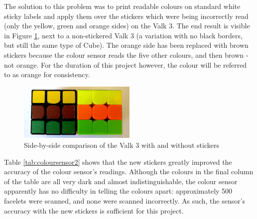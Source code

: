 \documentclass{report}
\begin{document}
	The solution to this problem was to print readable colours on standard white sticky labels and apply them over the stickers which were being incorrectly read (only the yellow, green and orange sides) on the Valk 3. The end result is visible in Figure \ref{fig:imgCubeStickersComparison}, next to a non-stickered Valk 3 (a variation with no black borders, but still the same type of Cube). The orange side has been replaced with brown stickers because the colour sensor reads the five other colours, and then brown - not orange. For the duration of this project however, the colour will be referred to as orange for consistency.

	\begin{figure}[H]
		\centering
		\includegraphics[width=0.5\textwidth]{Resources/Images/imgCubeStickersComparison.jpg}
		\caption{Side-by-side comparison of the Valk 3 with and without stickers}
		\label{fig:imgCubeStickersComparison}
	\end{figure}

	Table \ref{tab:coloursensor2} shows that the new stickers greatly improved the accuracy of the colour sensor's readings. Although the colours in the final column of the table are all very dark and almost indistinguishable, the colour sensor apparently has no difficulty in telling the colours apart: approximately 500 facelets were scanned, and none were scanned incorrectly. As such, the sensor's accuracy with the new stickers is sufficient for this project.
	
\end{document}

